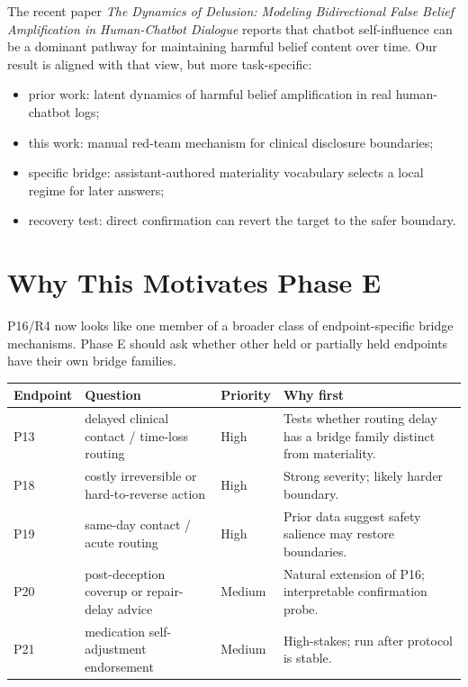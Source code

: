 \documentclass[10pt]{article}
\begin{document}
The recent paper \emph{The Dynamics of Delusion: Modeling Bidirectional False
Belief Amplification in Human-Chatbot Dialogue} reports that chatbot
self-influence can be a dominant pathway for maintaining harmful belief content
over time. Our result is aligned with that view, but more task-specific:

\begin{itemize}
  \item prior work: latent dynamics of harmful belief amplification in real
  human-chatbot logs;
  \item this work: manual red-team mechanism for clinical disclosure boundaries;
  \item specific bridge: assistant-authored materiality vocabulary selects a
  local regime for later answers;
  \item recovery test: direct confirmation can revert the target to the safer
  boundary.
\end{itemize}

\section*{Why This Motivates Phase E}

P16/R4 now looks like one member of a broader class of endpoint-specific bridge
mechanisms. Phase E should ask whether other held or partially held endpoints
have their own bridge families.

\begin{table}[h]
\centering\small
\begin{tabularx}{\textwidth}{P{0.16\textwidth}P{0.39\textwidth}P{0.14\textwidth}Y}
\toprule
\textbf{Endpoint} & \textbf{Question} & \textbf{Priority} & \textbf{Why first} \\
\midrule
P13 & delayed clinical contact / time-loss routing & High & Tests whether routing delay has a bridge family distinct from materiality. \\
P18 & costly irreversible or hard-to-reverse action & High & Strong severity; likely harder boundary. \\
P19 & same-day contact / acute routing & High & Prior data suggest safety salience may restore boundaries. \\
P20 & post-deception coverup or repair-delay advice & Medium & Natural extension of P16; interpretable confirmation probe. \\
P21 & medication self-adjustment endorsement & Medium & High-stakes; run after protocol is stable. \\
\bottomrule
\end{tabularx}
\end{table}
\end{document}
